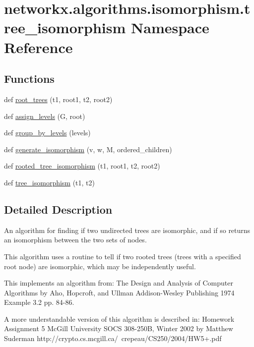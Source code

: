 \hypertarget{namespacenetworkx_1_1algorithms_1_1isomorphism_1_1tree__isomorphism}{}\section{networkx.\+algorithms.\+isomorphism.\+tree\+\_\+isomorphism Namespace Reference}
\label{namespacenetworkx_1_1algorithms_1_1isomorphism_1_1tree__isomorphism}
\subsection*{Functions}
\begin{DoxyCompactItemize}
\item 
def \hyperlink{namespacenetworkx_1_1algorithms_1_1isomorphism_1_1tree__isomorphism_a77029094aa772129dd7d77bd232fb577}{root\+\_\+trees} (t1, root1, t2, root2)
\item 
def \hyperlink{namespacenetworkx_1_1algorithms_1_1isomorphism_1_1tree__isomorphism_ab50c69d1ddd49d853681c8db00cf05da}{assign\+\_\+levels} (G, root)
\item 
def \hyperlink{namespacenetworkx_1_1algorithms_1_1isomorphism_1_1tree__isomorphism_a0c11ea1f0a596a6b819f810cf04b107f}{group\+\_\+by\+\_\+levels} (levels)
\item 
def \hyperlink{namespacenetworkx_1_1algorithms_1_1isomorphism_1_1tree__isomorphism_a28fa4e0e6f13d215fb862243e2138fc4}{generate\+\_\+isomorphism} (v, w, M, ordered\+\_\+children)
\item 
def \hyperlink{namespacenetworkx_1_1algorithms_1_1isomorphism_1_1tree__isomorphism_a77311446523f91a7c1fa30d21ce78e05}{rooted\+\_\+tree\+\_\+isomorphism} (t1, root1, t2, root2)
\item 
def \hyperlink{namespacenetworkx_1_1algorithms_1_1isomorphism_1_1tree__isomorphism_a5a92453309ab6be345c022472c2200d2}{tree\+\_\+isomorphism} (t1, t2)
\end{DoxyCompactItemize}


\subsection{Detailed Description}
\begin{DoxyVerb}An algorithm for finding if two undirected trees are isomorphic,
and if so returns an isomorphism between the two sets of nodes.

This algorithm uses a routine to tell if two rooted trees (trees with a
specified root node) are isomorphic, which may be independently useful.

This implements an algorithm from:
The Design and Analysis of Computer Algorithms
by Aho, Hopcroft, and Ullman
Addison-Wesley Publishing 1974
Example 3.2 pp. 84-86.

A more understandable version of this algorithm is described in:
Homework Assignment 5
McGill University SOCS 308-250B, Winter 2002
by Matthew Suderman
http://crypto.cs.mcgill.ca/~crepeau/CS250/2004/HW5+.pdf
\end{DoxyVerb}
 

